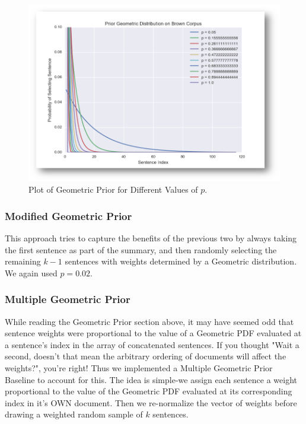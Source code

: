 \documentclass[11pt]{article}
\begin{document}
\begin{figure}[h!]
\centering
\includegraphics[scale=0.4]{geom_prior}
\caption{Plot of Geometric Prior for Different Values of $p$.}
\label{fig:geom_prior}
\end{figure}

\subsubsection{Modified Geometric Prior}
This approach tries to capture the benefits of the previous two by always taking the first sentence as part of the summary, and then randomly selecting the remaining $k-1$ sentences with weights determined by a Geometric distribution. We again used $p = 0.02$.

\subsubsection{Multiple Geometric Prior}
While reading the Geometric Prior section above, it may have seemed odd that sentence weights were proportional to the value of a Geometric PDF evaluated at a sentence's index in the array of concatenated sentences. If you thought "Wait a second, doesn't that mean the arbitrary ordering of documents will affect the weights?", you're right! Thus we implemented a Multiple Geometric Prior Baseline to account for this. The idea is simple-we assign each sentence a weight proportional to the value of the Geometric PDF evaluated at its corresponding index in it's OWN document. Then we re-normalize the vector of weights before drawing a weighted random sample of $k$ sentences.
\end{document}
